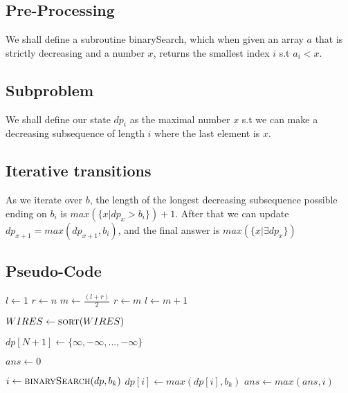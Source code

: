 \documentclass{article}
\begin{document}
\subsection{Pre-Processing}

We shall define a subroutine binarySearch, which when given an array $a$ that is strictly decreasing and a number $x$, returns the smallest index $i$ s.t $a_i < x$. 

\subsection{Subproblem}


We shall define our state $dp_{i}$ as the maximal number $x$ s.t we can make a decreasing subsequence of length $i$  where the last element is $x$. 

\subsection{Iterative transitions}

As we iterate over $b$, the length of the longest decreasing subsequence possible ending on $b_i$ is $max(\{x | dp_x> b_i\}) + 1$. After that we can update $dp_{x+1} = max(dp_{x+1},b_i)$, and the final answer is $max(\{x | \exists dp_x\})$


\subsection{Pseudo-Code}

\begin{algorithmic}[1]
\State $l \gets 1$
\State $r \gets n$
\State {}
\State $m \gets \frac{(l+r)}{2}$
\State {}
\State $r\gets m$
\State {}
\State $l \gets m+1$
\EndIf
\EndWhile
\State {}
\EndProcedure


\State $WIRES \gets \Call{sort}{WIRES}$

\State $dp[N+1] \gets \{\infty ,-\infty ,...,-\infty \}$

\State ${ans} \gets 0$

\State {}
\State $i \gets \Call{binarySearch}{dp,b_k}$
\State $dp[i] \gets max(dp[i],b_k)$
\State ${ans}\gets {max}(ans,i)$
\EndFor
\State {}
\EndProcedure

\end{algorithmic}
\end{document}
